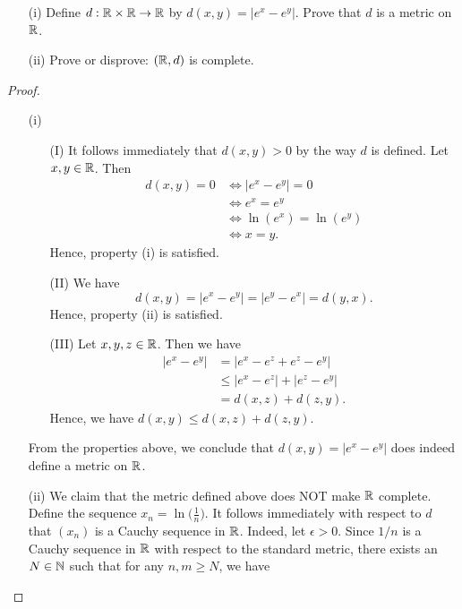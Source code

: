 \documentclass[a4paper]{article}
\begin{document}
\begin{problem}
    \begin{enumerate}
        \item[(i)] Define \( d: \mathbb{R} \times \mathbb{R} \to \mathbb{R}  \) by \( d(x,y) = | e^{x} - e^{y} |  \). Prove that \( d \) is a metric on \( \mathbb{R}  \).
        \item[(ii)] Prove or disprove: \( (\mathbb{R} , d) \) is complete.
    \end{enumerate}
\end{problem}
\begin{proof}
    \begin{enumerate}
        \item[(i)]  \begin{enumerate}
                
    \item[(I)] It follows immediately that \( d(x,y) > 0  \) by the way \( d  \) is defined. Let \( x,y \in \mathbb{R}  \). Then
        \begin{align*}
            d(x,y) = 0 &\iff | e^{x} - e^{y} | = 0  \\
                       &\iff e^{x}= e^{y} \tag{standard metric on \( \R  \)} \\
                       &\iff \ln(e^{x}) = \ln(e^{y}) \\
                       &\iff x = y.
        \end{align*}
        Hence, property (i) is satisfied.
    \item[(II)] We have 
        \[  d(x,y) = | e^{x} - e^{y} |  = | e^{y} - e^{x} |  = d(y,x). \]
        Hence, property (ii) is satisfied.
    \item[(III)] Let \( x,y,z \in \mathbb{R}  \). Then we have
        \begin{align*}
            | e^{x} - e^{y} | &= | e^{x} - e^{z} + e^{z} - e^{y} |  \\
                              &\leq | e^{x} - e^{z} |  + | e^{z} - e^{y} |  \\
                              &= d(x,z) + d(z,y).
        \end{align*}
        Hence, we have \( d(x,y) \leq d(x,z) + d(z,y) \).
\end{enumerate}
From the properties above, we conclude that \( d(x,y) = | e^{x} - e^{y} |  \) does indeed define a metric on \( \mathbb{R} \).
        \item[(ii)] We claim that the metric defined above does NOT make \( \mathbb{R} \) complete. Define the sequence \( {x}_{n} = \ln \Big(  \frac{ 1 }{ n }  \Big) \). It follows immediately with respect to \( d  \) that \( ({x}_{n}) \) is a Cauchy sequence in \( \mathbb{R}  \). Indeed, let \( \epsilon > 0  \). Since \( 1/n \) is a Cauchy sequence in \( \mathbb{R}  \) with respect to the standard metric, there exists an \( N \in \mathbb{N} \) such that for any \( n,m \geq N  \), we have 

\end{enumerate}
\end{proof}
\end{document}
